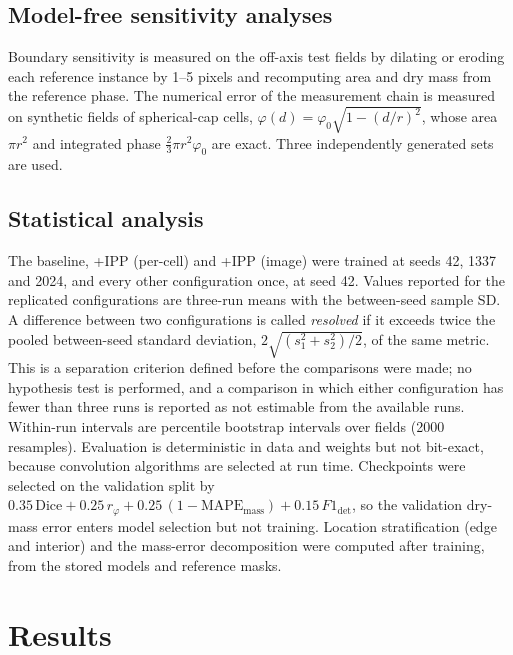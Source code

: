 \documentclass[11pt]{article}
\begin{document}
\subsection{Model-free sensitivity analyses}
\label{sec:modelfree}

Boundary sensitivity is measured on the off-axis test fields by dilating or
eroding each reference instance by 1--5 pixels and recomputing area and dry
mass from the reference phase. The numerical error of the measurement chain is
measured on synthetic fields of spherical-cap cells,
$\varphi(d)=\varphi_0\sqrt{1-(d/r)^2}$, whose area $\pi r^2$ and integrated
phase $\tfrac{2}{3}\pi r^2\varphi_0$ are exact. Three independently generated
sets are used.

\subsection{Statistical analysis}
\label{sec:stats}

The baseline, +IPP (per-cell) and +IPP (image) were trained at seeds 42, 1337
and 2024, and every other configuration once, at seed 42. Values reported for
the replicated configurations are three-run means with the between-seed sample
SD. A difference between two configurations is called \emph{resolved} if it
exceeds twice the pooled between-seed standard deviation,
$2\sqrt{(s_1^2+s_2^2)/2}$, of the same metric. This is a separation criterion
defined before the comparisons were made; no hypothesis test is performed, and a
comparison in which either configuration has fewer than three runs is reported
as not estimable from the available runs. Within-run intervals are percentile bootstrap intervals over
fields (2000 resamples). Evaluation is deterministic in data and weights but
not bit-exact, because convolution algorithms are selected at run time.
Checkpoints were selected on the validation split by
$0.35\,\mathrm{Dice}+0.25\,r_\varphi+0.25\,(1-\mathrm{MAPE}_\mathrm{mass})+0.15\,F1_\mathrm{det}$,
so the validation dry-mass error enters model selection but not training.
Location stratification (edge and interior) and the mass-error decomposition
were computed after training, from the stored models and reference masks.

\section{Results}
\label{sec:results}
\end{document}
